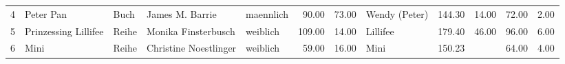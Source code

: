 \begin{table}
\begin{center}
{\begin{tabular}{rllllrrlrrrr}
  4 & Peter Pan                                                                                                                                                                                                                                                       & Buch & James M. Barrie                                                                                                                                                                                                                                                 & maennlich & 90.00 & 73.00 & Wendy (Peter)                                                                                                                                                                                                                                                   & 144.30 & 14.00 & 72.00 & 2.00 \\ 
  5 & Prinzessing Lillifee                                                                                                                                                                                                                                            & Reihe & Monika Finsterbusch                                                                                                                                                                                                                                             & weiblich & 109.00 & 14.00 & Lillifee                                                                                                                                                                                                                                                        & 179.40 & 46.00 & 96.00 & 6.00 \\ 
  6 & Mini                                                                                                                                                                                                                                                            & Reihe & Christine Noestlinger                                                                                                                                                                                                                                           & weiblich & 59.00 & 16.00 & Mini                                                                                                                                                                                                                                                            & 150.23 &  & 64.00 & 4.00 \\ 

\end{tabular}}
\end{center}
\end{table}
